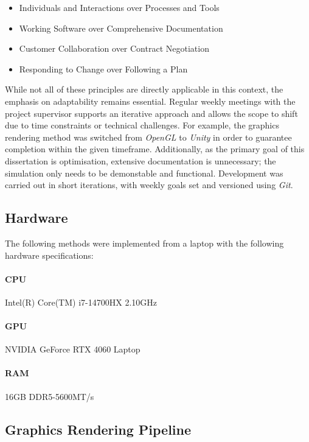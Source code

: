 \documentclass[12pt]{article}
\begin{document}
    \begin{itemize}
        \item Individuals and Interactions over Processes and Tools
        \item Working Software over Comprehensive Documentation
        \item Customer Collaboration over Contract Negotiation
        \item Responding to Change over Following a Plan
    \end{itemize}

    While not all of these principles are directly applicable in this context, the emphasis on adaptability remains essential. Regular weekly meetings with the project supervisor supports an iterative approach and allows the scope to shift due to time constraints or technical challenges. For example, the graphics rendering method was switched from \textit{OpenGL} to \textit{Unity} in order to guarantee completion within the given timeframe. Additionally, as the primary goal of this dissertation is optimisation, extensive documentation is unnecessary; the simulation only needs to be demonstable and functional. Development was carried out in short iterations, with weekly goals set and versioned using \textit{Git}.

    \subsection{Hardware}

    The following methods were implemented from a laptop with the following hardware specifications:

    \paragraph{CPU} Intel(R) Core(TM) i7-14700HX 2.10GHz
    \paragraph{GPU} NVIDIA GeForce RTX 4060 Laptop
    \paragraph{RAM} 16GB DDR5-5600MT/s

    \subsection{Graphics Rendering Pipeline}
\end{document}
